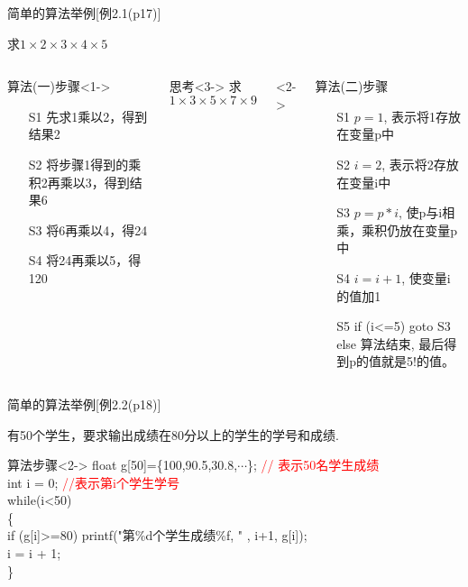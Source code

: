 \begin{frame}[shrink]{简单的算法举例[例2.1(p17)]}
\begin{example}
[例2.1(p17)] 求$1\times 2\times 3\times 4\times 5$
\end{example}
\vspace{-0.7cm}
\small
\begin{columns}[t]
\begin{block}{算法(一)步骤}<1->
\begin{enumerate}
\item[S1] 先求1乘以2，得到结果2
\item[S2] 将步骤1得到的乘积2再乘以3，得到结果6
\item[S3] 将6再乘以4，得24
\item[S4] 将24再乘以5，得120
\end{enumerate}	
\end{block}
\begin{block}{思考}<3->
求$1\times 3\times 5\times 7\times 9$
\end{block}
<2->
\begin{block}{算法(二)步骤}
\begin{enumerate}
\item[S1] $p=1$, 表示将1存放在变量p中
\item[S2] $i=2$, 表示将2存放在变量i中
\item[S3] $p=p*i$, 使p与i相乘，乘积仍放在变量p中
\item[S4] $i=i+1$, 使变量i的值加1
\item[S5] if (i<=5) goto S3\\
else 算法结束, 最后得到p的值就是5!的值。
\end{enumerate}	
\end{block}
\end{columns}
\end{frame}

\begin{frame}[shrink]{简单的算法举例[例2.2(p18)]}
\begin{example}
[例2.2(p18)] 有50个学生，要求输出成绩在80分以上的学生的学号和成绩.
\end{example}

\begin{block}{算法步骤}<2->
float g[50]=\{100,90.5,30.8,$\cdots$\}; \textcolor{red}{// 表示50名学生成绩}\\
int i = 0;  \textcolor{red}{//表示第i个学生学号}\\
while(i<50) \\
\{ \\
\qquad if (g[i]>=80) printf("第\%d个学生成绩\%f, " , i+1, g[i]); \\
\qquad i = i + 1;\\
\} 
\end{block}
\end{frame}

